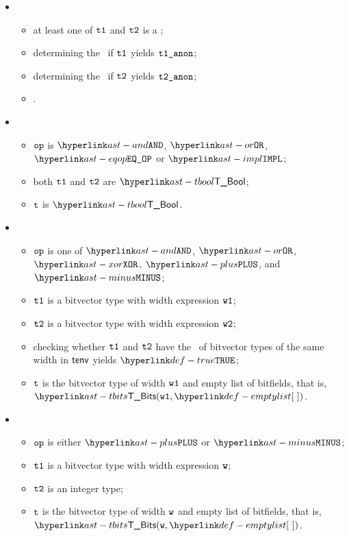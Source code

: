 \ProseParagraph
\OneApplies
\begin{itemize}
  \item {}
  \begin{itemize}
    \item at least one of $\texttt{t1}$ and $\texttt{t2}$ is a \namedtype;
    \item determining the \underlyingtype\ if $\texttt{t1}$ yields $\vtoneanon$\ProseOrTypeError;
    \item determining the \underlyingtype\ if $\texttt{t2}$ yields $\vttwoanon$\ProseOrTypeError;
    \item \Proseapplybinoptypes{$\tenv$}{$\op$}{$\vtoneanon$}{$\vttwoanon$}{$\vt$\ProseOrTypeError}.
  \end{itemize}

  \item {}
  \begin{itemize}
    \item $\op$ is $\AND$, $\OR$, $\EQOP$ or $\IMPL$;
    \item both $\texttt{t1}$ and $\texttt{t2}$ are $\TBool$;
    \item $\vt$ is $\TBool$.
  \end{itemize}

  \item {}
  \begin{itemize}
    \item $\op$ is one of $\AND$, $\OR$, $\XOR$, $\PLUS$, and $\MINUS$;
    \item $\texttt{t1}$ is a bitvector type with width expression $\texttt{w1}$;
    \item $\texttt{t2}$ is a bitvector type with width expression $\texttt{w2}$;
    \item checking whether $\texttt{t1}$ and $\texttt{t2}$ have the \structure\ of bitvector types
          of the same width in $\tenv$ yields $\True$\ProseOrTypeError;
    \item $\vt$ is the bitvector type of width $\texttt{w1}$ and empty list of bitfields, that is, \\ $\TBits(\vwone, \emptylist)$.
  \end{itemize}

  \item {}
  \begin{itemize}
    \item $\op$ is either $\PLUS$ or $\MINUS$;
    \item $\texttt{t1}$ is a bitvector type with width expression $\texttt{w}$;
    \item $\texttt{t2}$ is an integer type;
    \item $\vt$ is the bitvector type of width $\texttt{w}$ and empty list of bitfields, that is, \\ $\TBits(\vw, \emptylist)$.
  \end{itemize}


\end{itemize}
